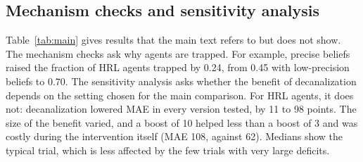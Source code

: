 \subsection{Mechanism checks and sensitivity analysis}\label{app:additional}

Table~\ref{tab:main} gives results that the main text refers to but does not show. The mechanism checks ask why agents are trapped. For example, precise beliefs raised the fraction of HRL agents trapped by 0.24, from 0.45 with low-precision beliefs to 0.70. The sensitivity analysis asks whether the benefit of decanalization depends on the setting chosen for the main comparison. For HRL agents, it does not: decanalization lowered MAE in every version tested, by 11 to 98 points. The size of the benefit varied, and a boost of 10 helped less than a boost of 3 and was costly during the intervention itself (MAE 108, against 62). Medians show the typical trial, which is less affected by the few trials with very large deficits.

